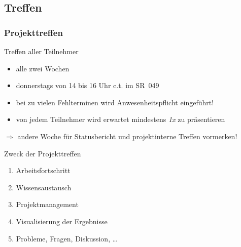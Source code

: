 \documentclass[ucs,9pt]{beamer}
\begin{document}
\subsection{Treffen}
\begin{frame}
  \frametitle{Projekttreffen}
  \begin{block}{Treffen aller Teilnehmer}
    \begin{itemize}
      \item alle zwei Wochen
      \item donnerstags von 14 bis 16 Uhr c.t. im SR~049
      \item bei zu vielen Fehlterminen wird Anwesenheitspflicht eingeführt!
      \item von jedem Teilnehmer wird erwartet mindestens \emph{1x} zu
          präsentieren
    \end{itemize}
  \end{block}
  $\Rightarrow$ andere Woche für Statusbericht und projektinterne Treffen vormerken!

  \begin{block}{Zweck der Projekttreffen}
    \begin{enumerate}
        \item Arbeitsfortschritt
        \item Wissensaustausch
        \item Projektmanagement
        \item Visualisierung der Ergebnisse
        \item Probleme, Fragen, Diskussion, \dots
    \end{enumerate}
  \end{block}
\end{frame}
\end{document}
